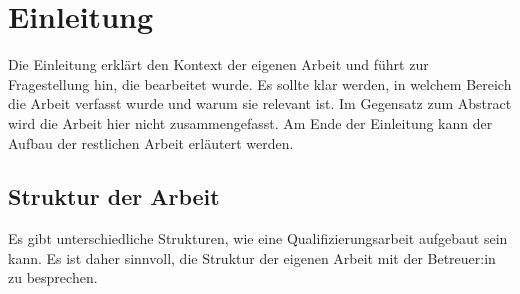 \chapter{Einleitung}
Die Einleitung erklärt den Kontext der eigenen Arbeit und führt zur Fragestellung hin, die bearbeitet wurde. Es sollte klar werden, in welchem Bereich die Arbeit verfasst wurde und warum sie relevant ist. Im Gegensatz zum Abstract wird die Arbeit hier nicht zusammengefasst. Am Ende der Einleitung kann der Aufbau der restlichen Arbeit erläutert werden.

\section{Struktur der Arbeit}

Es gibt unterschiedliche Strukturen, wie eine Qualifizierungsarbeit aufgebaut sein kann. Es ist daher sinnvoll, die Struktur der eigenen Arbeit mit der Betreuer:in zu besprechen. 

%

